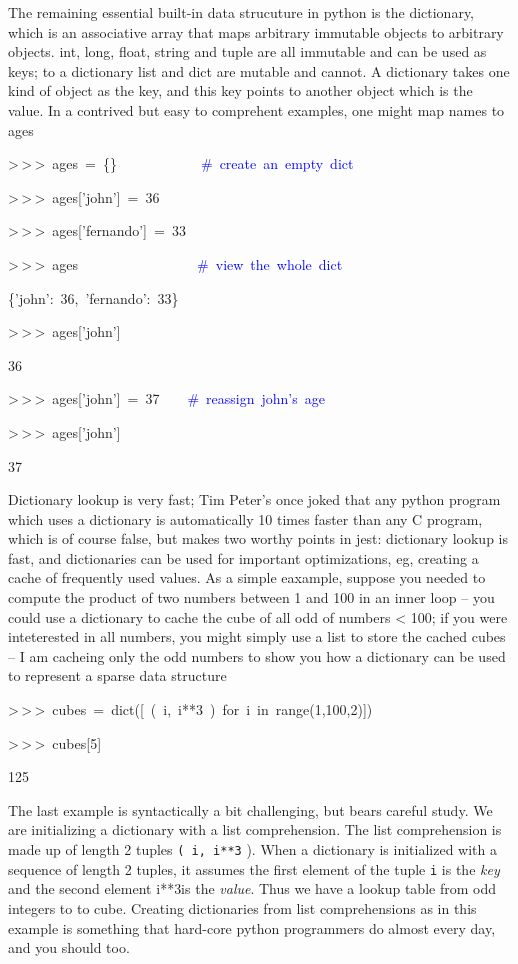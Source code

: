The remaining essential built-in data strucuture in python is the
dictionary, which is an associative array that maps arbitrary immutable
objects to arbitrary objects. int, long, float, string and tuple are
all immutable and can be used as keys; to a dictionary list and dict
are mutable and cannot. A dictionary takes one kind of object as the
key, and this key points to another object which is the value. In
a contrived but easy to comprehent examples, one might map names to
ages

\begin{lyxcode}
>\,{}>\,{}>~ages~=~\{\}~~~~~~~~~~~~\textcolor{blue}{\#~create~an~empty~dict}

>\,{}>\,{}>~ages{[}'john']~=~36

>\,{}>\,{}>~ages{[}'fernando']~=~33

>\,{}>\,{}>~ages~~~~~~~~~~~~~~~~~\textcolor{blue}{\#~view~the~whole~dict}

\{'john':~36,~'fernando':~33\}

>\,{}>\,{}>~ages{[}'john']

36

>\,{}>\,{}>~ages{[}'john']~=~37~~~~\textcolor{blue}{\#~reassign~john's~age}

>\,{}>\,{}>~ages{[}'john']

37
\end{lyxcode}
Dictionary lookup is very fast; Tim Peter's once joked that any python
program which uses a dictionary is automatically 10 times faster than
any C program, which is of course false, but makes two worthy points
in jest: dictionary lookup is fast, and dictionaries can be used for
important optimizations, eg, creating a cache of frequently used values.
As a simple eaxample, suppose you needed to compute the product of
two numbers between 1 and 100 in an inner loop -- you could use a
dictionary to cache the cube of all odd of numbers < 100; if you were
inteterested in all numbers, you might simply use a list to store
the cached cubes -- I am cacheing only the odd numbers to show you
how a dictionary can be used to represent a sparse data structure

\begin{lyxcode}


>\,{}>\,{}>~cubes~=~dict({[}~(~i,~i{*}{*}3~)~for~i~in~range(1,100,2)])

>\,{}>\,{}>~cubes{[}5]

125
\end{lyxcode}
The last example is syntactically a bit challenging, but bears careful
study.  We are initializing a dictionary with a list comprehension.
 The list comprehension is made up of length 2 tuples \texttt{( i,
i{*}{*}3} ).  When a dictionary is initialized with a sequence of
length 2 tuples, it assumes the first element of the tuple \texttt{i}
is the \textit{key} and the second element i{*}{*}3is the \textit{value}.
 Thus we have a lookup table from odd integers to to cube.  Creating
dictionaries from list comprehensions as in this example is something
that hard-core python programmers do almost every day, and you should
too.

